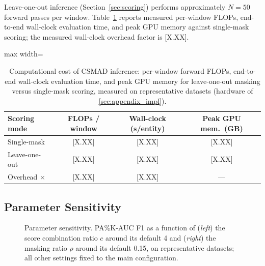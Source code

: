 Leave-one-out inference (Section~\ref{sec:scoring}) performs approximately $N=50$ forward passes
per window.
Table~\ref{tab:compute} reports measured per-window FLOPs, end-to-end wall-clock evaluation
time, and peak GPU memory against single-mask scoring; the measured wall-clock overhead factor
is [X.XX].

\begin{table}[tp]
\footnotesize
\centering
\caption{Computational cost of CSMAD inference: per-window forward FLOPs, end-to-end wall-clock
  evaluation time, and peak GPU memory for leave-one-out masking versus single-mask scoring,
  measured on representative datasets (hardware of \ref{sec:appendix_impl}).}
\label{tab:compute}
\begin{adjustbox}{max width=\linewidth}
\begin{tabular}{lccc}
\toprule
Scoring mode & FLOPs / window & Wall-clock (s/entity) & Peak GPU mem.\ (GB) \\
\midrule
Single-mask   & {[X.XX]} & {[X.XX]} & {[X.XX]} \\
Leave-one-out & {[X.XX]} & {[X.XX]} & {[X.XX]} \\
Overhead $\times$ & {[X.XX]} & {[X.XX]} & --- \\
\bottomrule
\end{tabular}
\end{adjustbox}
\end{table}

\subsection{Parameter Sensitivity}
\label{sec:param_sensitivity}

\begin{figure}[h]
  \centering
  \caption{Parameter sensitivity. PA\%K-AUC F1 as a function of (\textit{left}) the score
    combination ratio $c$ around its default 4 and (\textit{right}) the masking ratio $\rho$
    around its default 0.15, on representative datasets; all other settings fixed to the main
    configuration.}
  \label{fig:param_sensitivity}
\end{figure}

